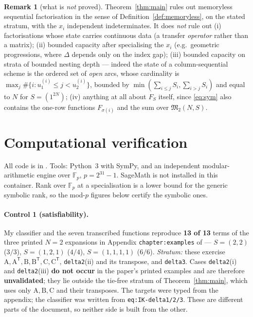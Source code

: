 \documentclass[11pt]{article}
\theoremstyle{plain}
\theoremstyle{definition}
\newtheorem{rem}[thm]{Remark}
\newcommand{\MM}{\mathfrak{M}}
\newcommand{\Dl}{\Delta}
\begin{document}
\begin{rem}[what is \emph{not} proved]
Theorem~\ref{thm:main} rules out memoryless sequential factorisation in the
sense of Definition~\ref{def:memoryless}, on the stated stratum, with the $x_i$
independent indeterminates. It does \emph{not} rule out
(i) factorisations whose state carries continuous data (a transfer
\emph{operator} rather than a matrix);
(ii) bounded capacity after specialising the $x_i$ (e.g.\ geometric
progressions, where $\Dl$ depends only on the index gap);
(iii) bounded capacity on strata of bounded nesting depth --- indeed the state
of a column-sequential scheme is the ordered set of \emph{open} arcs, whose
cardinality is $\max_j\#\{i: u_1^{(i)}\le j<u_2^{(i)}\}$, bounded by
$\min(\sum_{i\le j}S_i,\sum_{i>j}S_i)$ and equal to $N$ for $S=(1^{2N})$;
(iv) anything at all about $F_S$ itself, since \eqref{eq:sym} also contains the
one-row functions $F_{\sigma(i)}$ and the sum over $\MM_2(N,S)$.
\end{rem}

\section{Computational verification}
\label{sec:verif}

All code is in . Tools: Python~3 with SymPy, and an
independent modular-arithmetic engine over $\mathbb F_p$, $p=2^{31}-1$.
SageMath is not installed in this container. Rank over $\mathbb F_p$ at a
specialisation is a lower bound for the generic symbolic rank, so the mod-$p$
figures below certify the symbolic ones.

\paragraph{Control 1 (satisfiability).}
My classifier and the seven transcribed functions reproduce \textbf{13 of 13}
terms of the three printed $N=2$ expansions in Appendix
\texttt{chapter:examples} of \cite{GGW} --- $S=(2,2)$ ($3/3$), $S=(1,2,1)$
($4/4$), $S=(1,1,1,1)$ ($6/6$). \emph{Stratum:} these exercise
$\mathrm A,\mathrm A^{\mathsf T},\mathrm B,\mathrm B^{\mathsf T},\mathrm C,
\mathrm C^{\mathsf T}$, \texttt{delta2}(ii) and its transpose, and
\texttt{delta3}. Cases \texttt{delta2}(i) and \texttt{delta2}(iii) \textbf{do
not occur} in the paper's printed examples and are therefore
\textbf{unvalidated}; they lie outside the tie-free stratum of
Theorem~\ref{thm:main}, which uses only $\mathrm A,\mathrm B,\mathrm C$ and
their transposes.
The targets were typed from the appendix; the classifier was written from
\texttt{eq:IK-delta1/2/3}. These are different parts of the document, so neither
side is built from the other.
\end{document}

